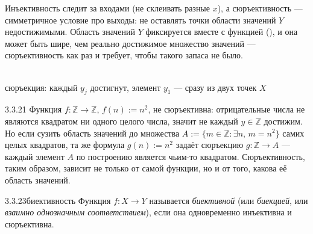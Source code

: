 \begin{intuition}
Инъективность следит за входами (не склеивать разные $x$), а сюръективность — симметричное
условие про выходы: не оставлять точки области значений $Y$ недостижимыми. Область значений
$Y$ фиксируется вместе с функцией (), и она может быть
шире, чем реально достижимое множество значений — сюръективность как раз и требует, чтобы
такого запаса не было.

\begin{center}
\\
{\footnotesize\color{intuitiongray}сюръекция: каждый $y_j$ достигнут, элемент $y_1$ — сразу
из двух точек $X$}
\end{center}
\end{intuition}

\begin{example}{3.3.21}{}
Функция $f:\mathbb{Z}\to\mathbb{Z}$, $f(n):=n^2$, не сюръективна: отрицательные числа не
являются квадратом ни одного целого числа, значит не каждый $y\in\mathbb{Z}$ достижим. Но
если сузить область значений до множества $A:=\{m\in\mathbb{Z} : \exists n,\, m=n^2\}$ самих
целых квадратов, та же формула $g(n):=n^2$ задаёт сюръекцию $g:\mathbb{Z}\to A$ — каждый
элемент $A$ по построению является чьим-то квадратом. Сюръективность, таким образом, зависит
не только от самой функции, но и от того, какова её область значений.
\end{example}

\begin{definition}{3.3.23}{биективность}
Функция $f:X\to Y$ называется \emph{биективной} (или \emph{биекцией}, или \emph{взаимно
однозначным соответствием}), если она одновременно инъективна и сюръективна.
\end{definition}

